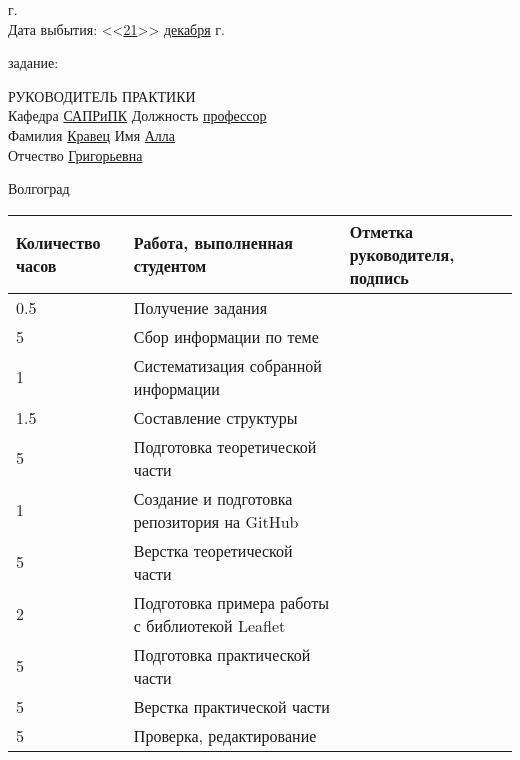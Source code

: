 \documentclass[a4paper, 14pt]{extreport}
\begin{document}
\begin{titlepage}
\begin{flushleft}
            \the\year г.\\
            Дата выбытия: \hspace{3cm}<<\underline{21}>> \underline{декабря\hspace{1.4cm}} 
            \the\year г.
        \end{flushleft}
        \vspace{1cm}
         задание: \underline{\hspace{10.7cm}}\\
        \underline{\hspace{16.5cm}}
        \vspace{1cm}
        \begin{flushleft}
            РУКОВОДИТЕЛЬ ПРАКТИКИ\\
            Кафедра \underline{САПРиПК\hspace{2.7cm}} Должность \underline{профессор\hspace{2.8cm}} \\
            Фамилия \underline{Кравец\hspace{3.3cm}} Имя \underline{Алла\hspace{5.5cm}}\\
            Отчество \underline{Григорьевна\hspace{2.2cm}}
        \end{flushleft}
        \vspace{\fill}
        \begin{center}
            Волгоград \the\year
        \end{center}
    \end{titlepage}
    \begin{table}[h!]
        \centering
        \begin{tabular}{|m{}|m{}|m{}|}
        \hline
        Количество часов & Работа, выполненная студентом & Отметка руководителя, подпись \\ \hline
        0.5 & Получение задания & \\ \hline
        5 & Сбор информации по теме & \\ \hline
        1 & Систематизация собранной информации & \\ \hline
        1.5 & Составление структуры & \\ \hline
        5 & Подготовка теоретической части & \\ \hline
        1 & Создание и подготовка репозитория на GitHub & \\ \hline
        5 & Верстка теоретической части & \\ \hline
        2 & Подготовка примера работы с библиотекой Leaflet & \\ \hline
        5 & Подготовка практической части & \\ \hline
        5 & Верстка практической части & \\ \hline
        5 & Проверка, редактирование & \\ \hline
        \end{tabular}
    \end{table}
\end{document}

